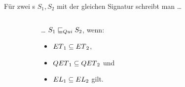 \begin{frame}
  \begin{Def}[Semantik]
  Für zwei \EIO{}s $S_1, S_2$ mit der gleichen Signatur schreibt man \dots
  \begin{columns}[]
    \begin{column}{.05\textwidth}
    \end{column}
    \begin{column}{.40\textwidth}
      \begin{block}{}
        \dots{} $S_1\sqsubseteq _{Qui} S_2$, wenn:
        \begin{itemize}
          \item $ET{}_1\subseteq ET{}_2$,
          \item $QET{}_1\subseteq QET{}_2$ und
          \item $EL{}_1\subseteq EL{}_2$ gilt.
        \end{itemize}
      \end{block}
    \end{column}
    \begin{column}{.05\textwidth}
    \end{column}
    \begin{column}{.40\textwidth}
    \end{column}
    \begin{column}{.05\textwidth}
    \end{column}
  \end{columns}
  \end{Def}
\end{frame}

